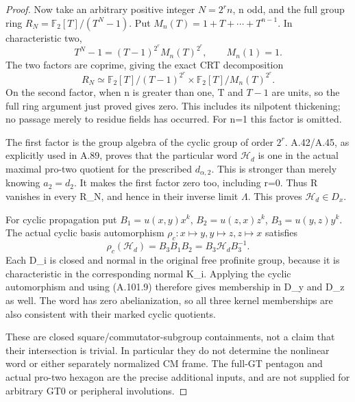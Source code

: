 \begin{proof}
Now take an arbitrary positive integer \(N=2^r n\), n odd, and
the full group ring \(R_N=\mathbb F_2[T]/(T^N-1)\). Put
\(M_n(T)=1+T+\cdots+T^{n-1}\). In characteristic two,
\[
 T^N-1=(T-1)^{2^r}M_n(T)^{2^r},\qquad M_n(1)=1.
 \tag{A.101.7}
\]
The two factors are coprime, giving the exact CRT decomposition
\[
 R_N\simeq\mathbb F_2[T]/(T-1)^{2^r}
       \times\mathbb F_2[T]/M_n(T)^{2^r}.
 \tag{A.101.8}
\]
On the second factor, when n is greater than one, T and \(T-1\) are
units, so the full ring argument just proved gives zero. This
includes its nilpotent thickening; no passage merely to residue
fields has occurred. For n=1 this factor is omitted.

The first factor is the group algebra of the cyclic group of order
\(2^r\). A.42/A.45, as explicitly used in A.89, proves that the
particular word \(\mathcal H_d\) is one in the actual maximal
pro-two quotient for the prescribed \(d_{\alpha,2}\). This is
stronger than merely knowing \(a_2=d_2\). It makes the first
factor zero too, including r=0. Thus R vanishes in every R_N,
and hence in their inverse limit \(\Lambda\). This proves
\(\mathcal H_d\in D_x\).

For cyclic propagation put
\(B_1=u(x,y)x^k\), \(B_2=u(z,x)z^k\),
\(B_3=u(y,z)y^k\). The actual cyclic basis automorphism
\(\rho_c:x\mapsto y,y\mapsto z,z\mapsto x\) satisfies
\[
 \rho_c(\mathcal H_d)=B_3B_1B_2
                       =B_3\mathcal H_dB_3^{-1}.
 \tag{A.101.9}
\]
Each D_i is closed and normal in the original free profinite group,
because it is characteristic in the corresponding normal K_i.
Applying the cyclic automorphism and using (A.101.9) therefore
gives membership in D_y and D_z as well. The word has zero
abelianization, so all three kernel memberships are also consistent
with their marked cyclic quotients.

These are closed square/commutator-subgroup containments, not a
claim that their intersection is trivial. In particular they do
not determine the nonlinear word or either separately normalized
CM frame. The full-GT pentagon and actual pro-two hexagon are the
precise additional inputs, and are not supplied for arbitrary GT0
or peripheral involutions.
\end{proof}
